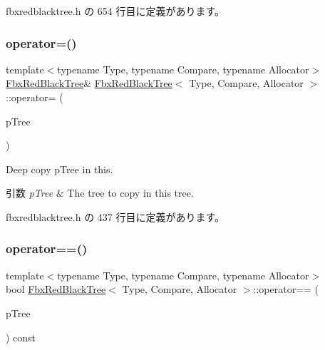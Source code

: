  fbxredblacktree.\+h の 654 行目に定義があります。

\mbox{\label{class_fbx_red_black_tree_aad39327aec57c013f40b53e5613ecb5b}} 
\subsubsection{\texorpdfstring{operator=()}{operator=()}}
{\footnotesize\ttfamily template$<$typename Type, typename Compare, typename Allocator$>$ \\
\hyperlink{class_fbx_red_black_tree}{Fbx\+Red\+Black\+Tree}\& \hyperlink{class_fbx_red_black_tree}{Fbx\+Red\+Black\+Tree}$<$ Type, Compare, Allocator $>$\+::operator= (\begin{DoxyParamCaption}\item[{const \hyperlink{class_fbx_red_black_tree}{Fbx\+Red\+Black\+Tree}$<$ Type, Compare, Allocator $>$ \&}]{p\+Tree }\end{DoxyParamCaption})\hspace{0.3cm}{\ttfamily [inline]}}

Deep copy p\+Tree in this. 
\begin{DoxyParams}{引数}
{\em p\+Tree} & The tree to copy in this tree. \\
\hline
\end{DoxyParams}


 fbxredblacktree.\+h の 437 行目に定義があります。

\mbox{\label{class_fbx_red_black_tree_a40aebf09d104a56e1e6724ac7acb66b9}} 
\subsubsection{\texorpdfstring{operator==()}{operator==()}}
{\footnotesize\ttfamily template$<$typename Type, typename Compare, typename Allocator$>$ \\
bool \hyperlink{class_fbx_red_black_tree}{Fbx\+Red\+Black\+Tree}$<$ Type, Compare, Allocator $>$\+::operator== (\begin{DoxyParamCaption}\item[{const \hyperlink{class_fbx_red_black_tree}{Fbx\+Red\+Black\+Tree}$<$ Type, Compare, Allocator $>$ \&}]{p\+Tree }\end{DoxyParamCaption}) const\hspace{0.3cm}{\ttfamily [inline]}}



